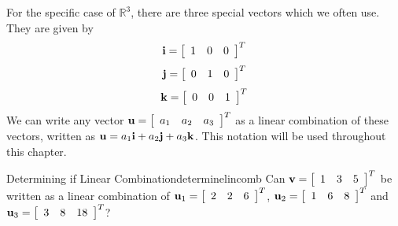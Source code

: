 For the specific case of $\mathbb{R}^3$, there are three special vectors which we often use. 
They are given by 
\begin{equation*}
{\bf i} = 
\left[
\begin{array}{rrr}
1 & 0 & 0
\end{array}
\right]^T
\end{equation*}
\begin{equation*}
{\bf j} = 
\left[
\begin{array}{rrr}
0 & 1 & 0
\end{array}
\right]^T
\end{equation*}
\begin{equation*}
{\bf k} = 
\left[
\begin{array}{rrr}
0 & 0 & 1
\end{array}
\right]^T
\end{equation*}
We can write any vector ${\bf u} = 
\left[
\begin{array}{rrr}
a_1 & a_2 & a_3
\end{array}
\right]^T$
as a linear combination of these vectors, written as ${\bf u} = a_1 {\bf i} + a_2 {\bf j} + a_3 {\bf k}$. This notation will be used throughout 
this chapter.

\begin{example}{Determining if Linear Combination}{determinelincomb}
Can ${\bf v}=\left[ \begin{array}{rrr}1 & 3 & 5 \end{array} \right]^T$ be written as a linear combination of ${\bf u}_1=\left[ \begin{array}{rrr}2 & 2 & 6 \end{array} \right]^T$, ${\bf u}_2=\left[ \begin{array}{rrr}1 & 6 & 8 \end{array} \right]^T$ and ${\bf u}_3=\left[ \begin{array}{rrr}3 & 8 & 18 \end{array} \right]^T$?
\end{example}

